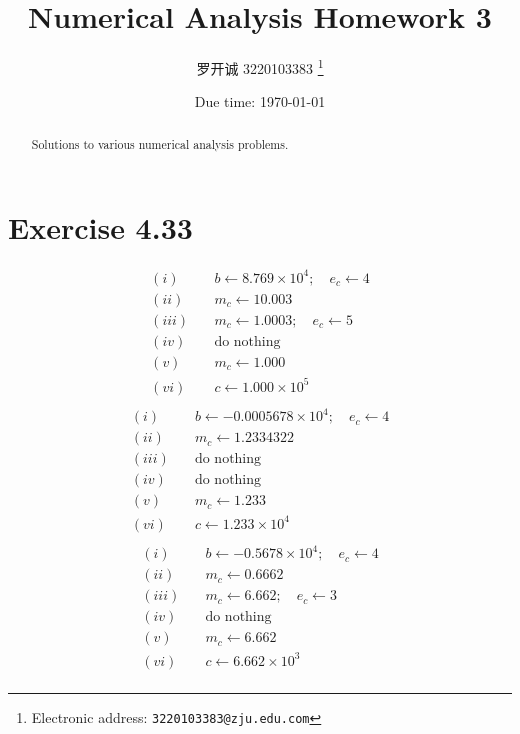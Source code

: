 \documentclass[a4paper]{article}
\begin{document}
\title{Numerical Analysis Homework 3}

\author{罗开诚 3220103383
  \thanks{Electronic address: \texttt{3220103383@zju.edu.com}}}

\date{Due time: \today}

\maketitle

\begin{abstract}
    Solutions to various numerical analysis problems.
\end{abstract}


\section*{Exercise 4.33}
\begin{align*}
  (i) & \quad b \gets 8.769 \times 10^4 ; \quad e_c \gets 4 \\
  (ii) & \quad m_c \gets 10.003 \\
  (iii) & \quad m_c \gets 1.0003 ; \quad e_c \gets 5 \\
  (iv) & \quad \text{do nothing} \\
  (v) & \quad m_c \gets 1.000 \\
  (vi) & \quad c \gets 1.000 \times 10^5 \\
\end{align*}
\begin{align*}
    (i) & \quad b \gets -0.0005678 \times 10^4 ; \quad e_c \gets 4 \\
    (ii) & \quad m_c \gets 1.2334322 \\
    (iii) & \quad \text{do nothing} \\
    (iv) & \quad \text{do nothing} \\
    (v) & \quad m_c \gets 1.233 \\
    (vi) & \quad c \gets 1.233 \times 10^4 \\
\end{align*}
\begin{align*}
  (i) & \quad b \gets -0.5678 \times 10^4 ; \quad e_c \gets 4 \\
  (ii) & \quad m_c \gets 0.6662 \\
  (iii) & \quad m_c \gets 6.662 ; \quad e_c \gets 3 \\
  (iv) & \quad \text{do nothing} \\
  (v) & \quad m_c \gets 6.662 \\
  (vi) & \quad c \gets 6.662 \times 10^3 \\
\end{align*}
\end{document}
